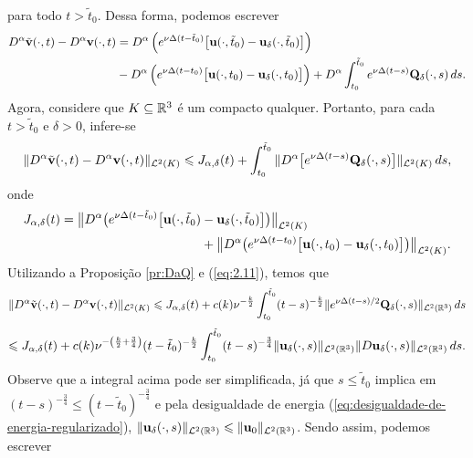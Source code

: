 \begin{prf}
\[    \]
    para todo $t > \tilde t_0$.
    Dessa forma, podemos escrever
    \[
        \begin{aligned}
            D^\alpha\tilde{\mathbf{v}}(\cdot,t) -  D^\alpha\mathbf{v}(\cdot,t) &= D^\alpha\left( e^{\nu\Delta(t-\tilde t_0)} \big[\mathbf{u}(\cdot,\tilde t_0) - \mathbf{u}_\delta(\cdot,\tilde t_0)\big] \right)\\ 
            &- D^\alpha\left( e^{\nu\Delta(t-t_0)} \big[\mathbf{u}(\cdot, t_0) - \mathbf{u}_\delta(\cdot, t_0)\big] \right)
            + D^\alpha\int_{t_0}^{\tilde t_0} e^{\nu\Delta(t-s)}\mathbf{Q}_{\delta}(\cdot,s) \,ds.
        \end{aligned}
    \]
    Agora, considere que $K \subseteq \mathbb{R}^3$ é um compacto qualquer. Portanto, para cada $t > \tilde t_0$ e $\delta > 0$, infere-se
    \begin{equation} \label{eq:acima}
        \Vert D^\alpha\tilde{\mathbf{v}}(\cdot,t) -  D^\alpha\mathbf{v}(\cdot,t) \Vert_{\mathcal{L}^2(K)} \leqslant J_{\alpha,\delta}(t) + \int_{t_0}^{\tilde t_0} \Vert D^\alpha\big[ e^{\nu\Delta(t-s)}\mathbf{Q}_{\delta}(\cdot,s)\big] \Vert_{\mathcal{L}^2(K)}\,ds,
    \end{equation}
    onde
    \[
        \begin{aligned}
            J_{\alpha,\delta}(t) = \big\Vert D^\alpha\big( e^{\nu\Delta(t-\tilde t_0)} \big[\mathbf{u}(\cdot,\tilde t_0) &- \mathbf{u}_\delta(\cdot,\tilde t_0)\big] \big) \big\Vert _{\mathcal{L}^2(K)} \\
            &+ \big\Vert D^\alpha\big( e^{\nu\Delta(t-t_0)} \big[\mathbf{u}(\cdot, t_0) - \mathbf{u}_\delta(\cdot, t_0)\big] \big) \big\Vert _{\mathcal{L}^2(K)}.
        \end{aligned}
    \]
    Utilizando a Proposição \ref{pr:DaQ} e (\ref{eq:2.11}), temos que
    \[
        \Vert D^\alpha\tilde{\mathbf{v}}(\cdot,t) -  D^\alpha\mathbf{v}(\cdot,t) \Vert_{\mathcal{L}^2(K)} \leqslant J_{\alpha,\delta}(t) + c(k) \nu^{-\frac{k}{2}}\int_{t_0}^{\tilde t_0} (t - s)^{-\frac{k}{2}} \Vert e^{\nu\Delta(t-s)/2}\mathbf{Q}_{\delta}(\cdot,s) \Vert_{\mathcal{L}^2(\mathbb{R}^3)} \,ds
    \]
    \begin{equation} \label{eq:3.3}
        \leqslant J_{\alpha,\delta}(t) + c(k) \nu^{-\left( \frac{k}{2} + \frac{3}{4} \right)} (t - \tilde t_0)^{-\frac{k}{2}} \int_{t_0}^{\tilde t_0} (t-s)^{-\frac{3}{4}} \Vert \mathbf{u}_\delta(\cdot,s) \Vert_{\mathcal{L}^2(\mathbb{R}^3)} \Vert D\mathbf{u}_\delta(\cdot,s) \Vert_{\mathcal{L}^2(\mathbb{R}^3)} \,ds.
    \end{equation}
    Observe que a integral acima pode ser simplificada, já que $s \leqslant \tilde t_0$ implica em $(t - s)^{-\frac{3}{4}} \leqslant (t - \tilde t_0)^{-\frac{3}{4}}$ e pela desigualdade de energia (\ref{eq:desigualdade-de-energia-regularizado}), $\Vert \mathbf{u}_\delta(\cdot,s) \Vert_{\mathcal{L}^2(\mathbb{R}^3)} \leqslant \Vert \mathbf{u}_0 \Vert_{\mathcal{L}^2(\mathbb{R}^3)}$. Sendo assim, podemos escrever

\end{prf}

